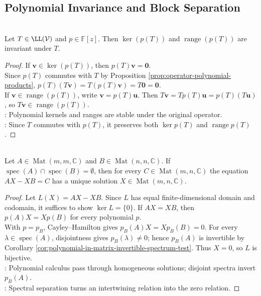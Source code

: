 \subsection{Polynomial Invariance and Block Separation}
\begin{proposition} \label{prop:kernel-range-polynomial-in-operator-invariant} \label{prop:kernel-of-polynomial-in-operator-is-invariant} \\
Let $T\in\LL(\mathcal{V})$ and $p\in\mathbb{F}[z]$. Then $\ker(p(T))$ and $\operatorname{range}(p(T))$ are invariant under $T$.
\begin{proof}
If $\mathbf{v}\in\ker(p(T))$, then $p(T)\mathbf{v}=\mathbf{0}$.\\
Since $p(T)$ commutes with $T$ by Proposition \ref{prop:operator-polynomial-products}, $p(T)(T\mathbf{v})=T(p(T)\mathbf{v})=T\mathbf{0}=\mathbf{0}$.\\
If $\mathbf{v}\in\operatorname{range}(p(T))$, write $\mathbf{v}=p(T)\mathbf{u}$. Then $T\mathbf{v}=Tp(T)\mathbf{u}=p(T)(T\mathbf{u})$, so $T\mathbf{v}\in\operatorname{range}(p(T))$.\\
: Polynomial kernels and ranges are stable under the original operator.\\
: Since $T$ commutes with $p(T)$, it preserves both $\ker p(T)$ and $\operatorname{range}p(T)$.
\end{proof}
\end{proposition}

\begin{theorem} \label{thm:sylvester-linear-matrix-equation} \\
Let $A\in\operatorname{Mat}(m,m,\mathbb{C})$ and $B\in\operatorname{Mat}(n,n,\mathbb{C})$. If $\operatorname{spec}(A)\cap\operatorname{spec}(B)=\emptyset$, then for every $C\in\operatorname{Mat}(m,n,\mathbb{C})$ the equation $AX-XB=C$ has a unique solution $X\in\operatorname{Mat}(m,n,\mathbb{C})$.
\begin{proof}
Let $L(X)=AX-XB$. Since $L$ has equal finite-dimensional domain and codomain, it suffices to show $\ker L=\{0\}$. If $AX=XB$, then $p(A)X=Xp(B)$ for every polynomial $p$. \\
With $p=p_B$, Cayley--Hamilton gives $p_B(A)X=Xp_B(B)=0$. For every $\lambda\in\operatorname{spec}(A)$, disjointness gives $p_B(\lambda)\neq0$; hence $p_B(A)$ is invertible by Corollary \ref{cor:polynomial-in-matrix-invertible-spectrum-test}. Thus $X=0$, so $L$ is bijective.\\
: Polynomial calculus pass through homogeneous solutions; disjoint spectra invert $p_B(A)$.\\
: Spectral separation turns an intertwining relation into the zero relation.
\end{proof}
\end{theorem}

